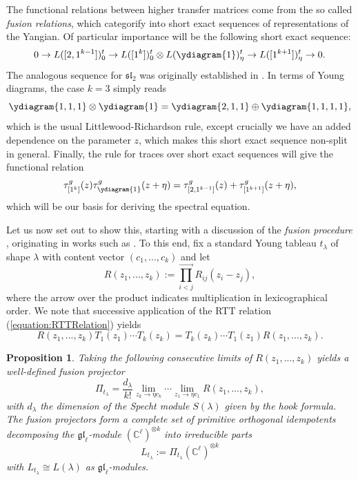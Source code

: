 \documentclass[11pt]{report}
\newtheorem{prop}[theorem]{Proposition}
\theoremstyle{definition}
\theoremstyle{remark}
\theoremstyle{remark}
\newcommand{\C}{\mathbb{C}}
\begin{document}
The functional relations between higher transfer matrices come from the so called \emph{fusion relations}, which categorify into short exact sequences of representations of the Yangian. Of particular importance will be the following short exact sequence:
\begin{equation*}
0 \to L([2,1^{k-1}])_0^t \to L([1^k])_0^t \otimes L(\ydiagram{1})_\eta^t \to L([1^{k+1}])_\eta^t \to 0.
\end{equation*}
The analogous sequence for $\mathfrak{sl}_2$ was originally established in \cite{article:chari:1990}. In terms of Young diagrams, the case $k=3$ simply reads
\begin{equation*}
\ydiagram{1,1,1} \otimes \ydiagram{1} = \ydiagram{2,1,1} \oplus \ydiagram{1,1,1,1},
\end{equation*}
which is the usual Littlewood-Richardson rule, except crucially we have an added dependence on the parameter $z$, which makes this short exact sequence non-split in general. Finally, the rule for traces over short exact sequences will give the functional relation
\begin{equation*}
\tau_{[1^k]}^g(z) \tau_{\ydiagram{1}}^g(z+\eta) = \tau_{[2,1^{k-1}]}^g(z) + \tau_{[1^{k+1}]}^g(z+\eta),
\end{equation*}
which will be our basis for deriving the spectral equation.

Let us now set out to show this, starting with a discussion of the \emph{fusion procedure} \cite{article:molev:2008}, originating in works such as \cite{article:kulish:1981}. To this end, fix a standard Young tableau $t_\lambda$ of shape $\lambda$ with content vector $(c_1,...,c_k)$ and let
\begin{equation*}
R(z_1,...,z_k) := \overset{\longrightarrow}{\prod_{i<j}} R_{ij}(z_i-z_j),
\end{equation*}
where the arrow over the product indicates multiplication in lexicographical order. We note that successive application of the RTT relation (\ref{equation:RTTRelation}) yields
\begin{equation}\label{equation:higherRTT}
R(z_1,...,z_k) T_1(z_1) \cdots T_k(z_k) = T_k(z_k) \cdots T_1(z_1) R(z_1,...,z_k).
\end{equation}

\begin{prop}\label{prop:fusionDecomposition}
Taking the following consecutive limits of $R(z_1,...,z_k)$ yields a well-defined \emph{fusion projector}
\begin{equation*}
\Pi_{t_\lambda} = \frac{d_\lambda}{k!} \lim_{z_k \to \eta c_k} \cdots \lim_{z_1 \to \eta c_1} R(z_1,...,z_k),
\end{equation*}
with $d_\lambda$ the dimension of the Specht module $S(\lambda)$ given by the hook formula. The fusion projectors form a complete set of primitive orthogonal idempotents decomposing the $\mathfrak{gl}_\ell$-module $(\C^\ell)^{\otimes k}$ into irreducible parts
\begin{equation*}
L_{t_\lambda} := \Pi_{t_\lambda} (\C^\ell)^{\otimes k}
\end{equation*}
with $L_{t_\lambda} \cong L(\lambda)$ as $\mathfrak{gl}_\ell$-modules.
\end{prop}
\end{document}
